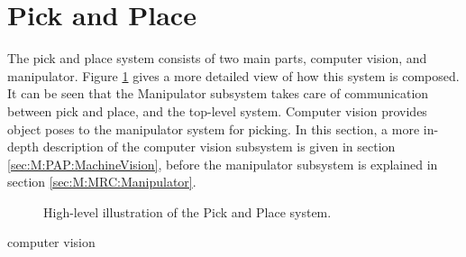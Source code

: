 





\newpage
\section{Pick and Place} \label{M:PickAndPlace}
The pick and place system consists of two main parts, computer vision, and manipulator. Figure \ref{fig:M:PAP:PickAndPlaceMethod} gives a more detailed view of how this system is composed. It can be seen that the Manipulator subsystem takes care of communication between pick and place, and the top-level system. Computer vision provides object poses to the manipulator system for picking. In this section, a more in-depth description of the computer vision subsystem is given in section \ref{sec:M:PAP:MachineVision}, before the manipulator subsystem is explained in section \ref{sec:M:MRC:Manipulator}.

\begin{figure}[htp!]
    \fontsize{8}{14}\selectfont
    \centering
    
    \caption{High-level illustration of the Pick and Place system. }
    \label{fig:M:PAP:PickAndPlaceMethod}
\end{figure}computer vision

